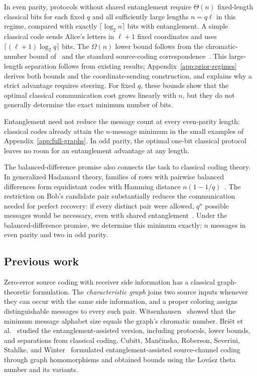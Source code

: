 \documentclass[11pt,a4paper]{article}
\numberwithin{equation}{section}
\numberwithin{figure}{section}
\numberwithin{table}{section}
\numberwithin{footnote}{section}
\theoremstyle{informal}\newtheorem*{informaltheorem}{Informal theorem}
\theoremstyle{definition}\newtheorem{example}{Example}[section]
\theoremstyle{remark}\newtheorem{remark}[theorem]{Remark}
\begin{document}
In even parity, protocols without shared entanglement require
\(\Theta(n)\) fixed-length classical bits for each fixed \(q\) and
all sufficiently large lengths \(n=q\ell\) in this regime, compared
with exactly \(\lceil\log_2 n\rceil\) bits with entanglement.
A simple classical code sends Alice's letters in \(\ell+1\) fixed
coordinates and uses \(\lceil(\ell+1)\log_2 q\rceil\) bits.
The \(\Omega(n)\) lower bound follows from the chromatic-number
bound of~\cite[Theorem~1.9]{cao} and the standard source-coding
correspondence~\mbox{\cite[Sec.~1.1]{bblps}}.
This large-length separation follows from existing results;
Appendix~\ref{app:prior-regimes} derives both bounds and the
coordinate-sending construction, and explains why a strict advantage
requires steering. For fixed \(q\), these bounds show
that the optimal classical communication cost grows linearly with
\(n\), but they do not generally determine the exact minimum
number of bits.

Entanglement need not reduce the message count at every even-parity
length: classical codes already attain the
\(n\)-message minimum in the small examples of
Appendix~\ref{app:full-graphs}. In odd parity, the optimal one-bit
classical protocol leaves no room for an entanglement advantage at
any length.

The balanced-difference promise also connects the task to classical
coding theory.
In generalized Hadamard theory, families of rows with pairwise balanced
differences form equidistant
codes with Hamming distance \(n(1-1/q)\)~\cite[Sec.~II]{bcp}.
The restriction on Bob's candidate pair substantially reduces the
communication needed for perfect recovery: if every distinct pair were
allowed, \(q^n\) possible messages would be necessary, even
with shared entanglement~\cite[Theorem~2.1]{bblps}.
Under the balanced-difference promise, we determine this minimum
exactly: \(n\) messages in even parity and two in odd parity.

\subsection{Previous work}

Zero-error source coding with receiver side information has a
classical graph-theoretic formulation. The \emph{characteristic graph}
joins two source inputs whenever they can occur with the same side
information, and a proper coloring assigns distinguishable messages
to every such pair. Witsenhausen~\cite{wits} showed that the minimum
message alphabet size equals the graph's chromatic number. Bri\"et
et al.~\cite{bblps} studied the entanglement-assisted version,
including protocols, lower bounds, and separations from classical
coding. Cubitt, Man\v{c}inska, Roberson, Severini, Stahlke, and
Winter~\cite{cmrssw} formulated entanglement-assisted source-channel
coding through graph homomorphisms and obtained bounds
using the Lov\'asz theta number and its variants.
\end{document}
